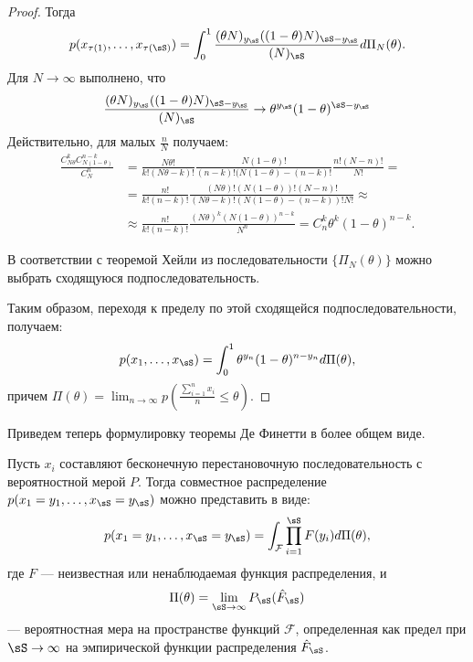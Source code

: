 \begin{proof}
Тогда 
\[
p(x_{\tau(1)}, \ldots, x_{\tau(\sS)}) = \int_{0}^1 
\frac{(\theta N)_{y_\sS} ((1 - \theta) N)_{\sS - y_\sS}}{(N)_\sS} d \Pi_N(\theta).
\]
Для $N \rightarrow \infty$ выполнено, что
\[
\frac{(\theta N)_{y_\sS} ((1 - \theta) N)_{\sS - y_\sS}}{(N)_\sS} \rightarrow \theta^{y_\sS} (1 - \theta)^{\sS - y_\sS}
\]
Действительно, для малых $\frac{n}{N}$ получаем:
\begin{align*}
\frac{C^k_{N \theta} C^{n - k}_{N (1 - \theta)}}{C^n_N} &= 
\frac{N \theta!}{k! (N \theta - k)!} 
\frac{N (1 - \theta)!}{(n - k)! (N (1 - \theta) - (n - k)!}  \frac{n! (N - n)!}{N!} = \\
&= \frac{n!}{k! (n - k)!} \frac{(N \theta)! (N (1 - \theta))! (N - n)!}{(N \theta - k)! (N(1 - \theta) - (n - k))! N!} \approx \\
&\approx \frac{n!}{k! (n - k)!}  \frac{(N \theta)^k (N(1 - \theta))^{n - k}}{N^n} = C_n^k \theta^k (1 - \theta)^{n - k}.
\end{align*}

В соответствии с теоремой Хейли из последовательности $\{\Pi_N(\theta)\}$ можно выбрать сходящуюся подпоследовательность.

Таким образом, переходя к пределу по этой сходящейся подпоследовательности, получаем:
\[
p(x_{1}, \ldots, x_{\sS}) = \int_{0}^1 \theta^{y_n} (1 - \theta)^{n - y_n} d\Pi(\theta),
\]
причем $\Pi(\theta) = \lim_{n \rightarrow \infty} p\left(\frac{\sum_{i = 1}^n x_i}{n} \leq \theta\right)$.

\end{proof}

Приведем теперь формулировку теоремы Де Финетти в более общем виде.
\begin{Theorem}
Пусть $x_i$ составляют бесконечную перестановочную последовательность с вероятностной мерой $P$. 
Тогда совместное распределение $p(x_1 = y_1, \ldots, x_{\sS} = y_{\sS})$ можно представить в виде:
\[
p(x_1 = y_1, \ldots, x_{\sS} = y_{\sS}) = \int_{\mathcal{F}} \prod_{i = 1}^{\sS} F(y_i) d \Pi(\theta),
\]
где $F$ --- неизвестная или ненаблюдаемая функция распределения, и
\[
\Pi(\theta) = \lim_{\sS \rightarrow \infty} P_{\sS}(\hat{F}_{\sS})
\]
--- вероятностная мера на пространстве функций $\mathcal{F}$,
определенная как предел при $\sS \rightarrow \infty$ на эмпирической функции распределения $\hat{F}_{\sS}$.

\end{Theorem}

